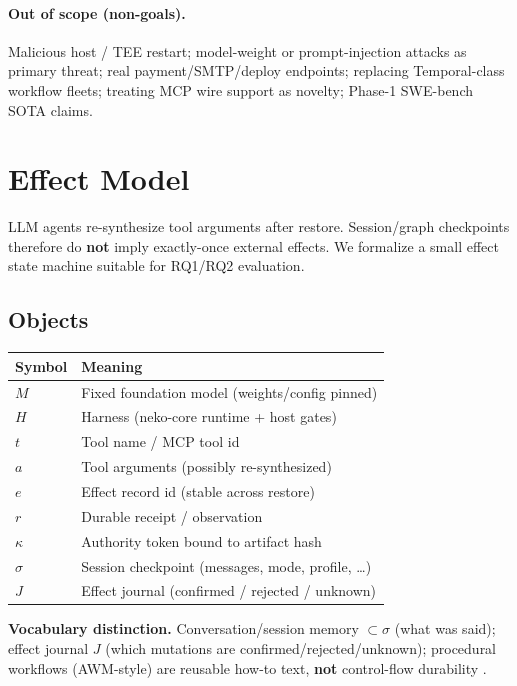\documentclass[11pt,a4paper]{article}
\begin{document}
\paragraph{Out of scope (non-goals).}
Malicious host / TEE restart; model-weight or prompt-injection attacks as
primary threat; real payment/SMTP/deploy endpoints; replacing Temporal-class
workflow fleets; treating MCP wire support as novelty; Phase-1 SWE-bench
SOTA claims.

\section{Effect Model}
\label{sec:model}

LLM agents re-synthesize tool arguments after restore. Session/graph
checkpoints therefore do \textbf{not} imply exactly-once external effects.
We formalize a small effect state machine suitable for RQ1/RQ2 evaluation.

\subsection{Objects}

\begin{center}
\begin{tabular}{@{}ll@{}}
\toprule
Symbol & Meaning \\
\midrule
$M$ & Fixed foundation model (weights/config pinned) \\
$H$ & Harness (neko-core runtime + host gates) \\
$t$ & Tool name / MCP tool id \\
$a$ & Tool arguments (possibly re-synthesized) \\
$e$ & Effect record id (stable across restore) \\
$r$ & Durable receipt / observation \\
$\kappa$ & Authority token bound to artifact hash \\
$\sigma$ & Session checkpoint (messages, mode, profile, \ldots) \\
$J$ & Effect journal (confirmed / rejected / unknown) \\
\bottomrule
\end{tabular}
\end{center}

\noindent\textbf{Vocabulary distinction.}
Conversation/session memory $\subset \sigma$ (what was said); effect
journal $J$ (which mutations are confirmed/rejected/unknown); procedural
workflows (AWM-style) are reusable how-to text, \textbf{not} control-flow
durability \cite{awm2025}.
\end{document}
